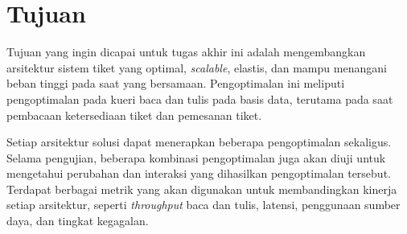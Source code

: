 \section{Tujuan}

Tujuan yang ingin dicapai untuk tugas akhir ini adalah mengembangkan arsitektur sistem tiket yang optimal, \textit{scalable}, elastis, dan mampu menangani beban tinggi pada saat yang bersamaan. Pengoptimalan ini meliputi pengoptimalan pada kueri baca dan tulis pada basis data, terutama pada saat pembacaan ketersediaan tiket dan pemesanan tiket.

Setiap arsitektur solusi dapat menerapkan beberapa pengoptimalan sekaligus. Selama pengujian, beberapa kombinasi pengoptimalan juga akan diuji untuk mengetahui perubahan dan interaksi yang dihasilkan pengoptimalan tersebut. Terdapat berbagai metrik yang akan digunakan untuk membandingkan kinerja setiap arsitektur, seperti \textit{throughput} baca dan tulis, latensi, penggunaan sumber daya, dan tingkat kegagalan.
